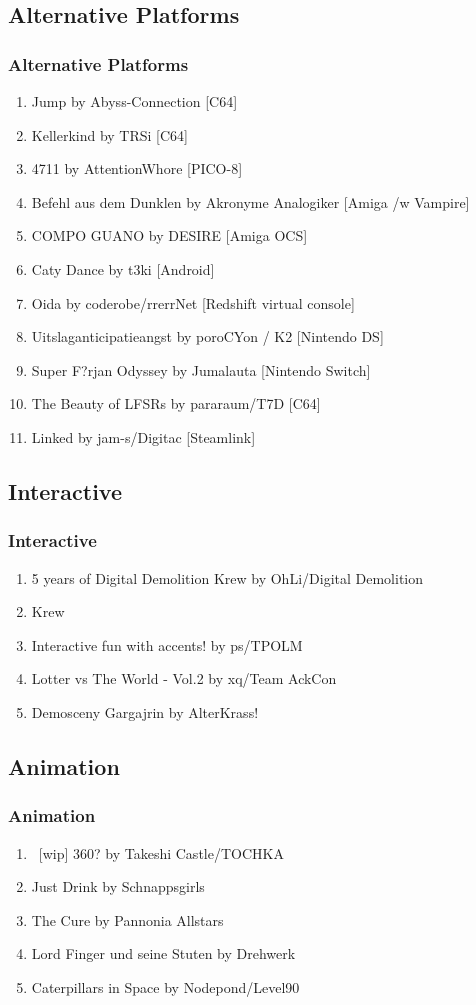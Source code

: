 \documentclass{beamer}
\begin{document}
\subsection{Alternative Platforms}
\begin{frame}
  \frametitle{Alternative Platforms}
  \begin{enumerate}
  \item Jump by Abyss-Connection [C64]
  \item Kellerkind by TRSi [C64]
  \item 4711 by AttentionWhore [PICO-8]
  \item Befehl aus dem Dunklen by Akronyme Analogiker [Amiga /w Vampire]
  \item COMPO GUANO by DESIRE [Amiga OCS]
  \item Caty Dance by t3ki [Android]
  \item Oida by coderobe/rrerrNet [Redshift virtual console]
  \item Uitslaganticipatieangst by poroCYon / K2 [Nintendo DS]
  \item Super F?rjan Odyssey by Jumalauta [Nintendo Switch]
  \item The Beauty of LFSRs by pararaum/T7D [C64]
  \item Linked by jam-s/Digitac [Steamlink]
  \end{enumerate}
\end{frame}


\subsection{Interactive}
\begin{frame}
  \frametitle{Interactive}
  \begin{enumerate}
  \item 5 years of Digital Demolition Krew by OhLi/Digital Demolition
  \item Krew
  \item Interactive fun with accents! by ps/TPOLM
  \item Lotter vs The World - Vol.2 by xq/Team AckCon
  \item Demosceny Gargajrin by AlterKrass!
  \end{enumerate}
\end{frame}

\subsection{Animation}
\begin{frame}
  \frametitle{Animation}
  \begin{enumerate}
  \item \ [wip] 360? by Takeshi Castle/TOCHKA
  \item Just Drink by Schnappsgirls
  \item The Cure by Pannonia Allstars
  \item Lord Finger und seine Stuten by Drehwerk
  \item Caterpillars in Space by Nodepond/Level90
  \end{enumerate}
\end{frame}
\end{document}
